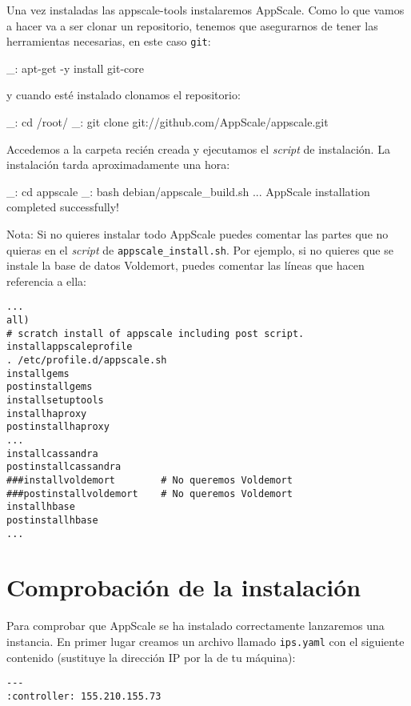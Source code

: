 Una vez instaladas las appscale-tools instalaremos AppScale. Como lo que vamos a hacer va a ser clonar un repositorio, tenemos que asegurarnos de tener las herramientas necesarias, en este caso \texttt{git}:

\begin{bashcode}
_: apt-get -y install git-core
\end{bashcode}

y cuando esté instalado clonamos el repositorio:

\begin{bashcode}
_: cd /root/
_: git clone git://github.com/AppScale/appscale.git
\end{bashcode}

Accedemos a la carpeta recién creada y ejecutamos el \emph{script} de instalación. La instalación tarda aproximadamente una hora:

\begin{bashcode}
_: cd appscale
_: bash debian/appscale_build.sh
...
AppScale installation completed successfully!
\end{bashcode}

Nota: Si no quieres instalar todo AppScale puedes comentar las partes que no quieras en el \emph{script} de \texttt{appscale\_install.sh}. Por ejemplo, si no quieres que se instale la base de datos Voldemort, puedes comentar las líneas que hacen referencia a ella:

\begin{lstlisting}
...
all)
# scratch install of appscale including post script.
installappscaleprofile
. /etc/profile.d/appscale.sh
installgems
postinstallgems
installsetuptools
installhaproxy
postinstallhaproxy
...
installcassandra
postinstallcassandra
###installvoldemort        # No queremos Voldemort
###postinstallvoldemort    # No queremos Voldemort
installhbase
postinstallhbase
...
\end{lstlisting}


\section{Comprobación de la instalación}

Para comprobar que AppScale se ha instalado correctamente lanzaremos una instancia. En primer lugar creamos un archivo llamado \texttt{ips.yaml} con el siguiente contenido (sustituye la dirección IP por la de tu máquina):

\begin{lstlisting}
--- 
:controller: 155.210.155.73
\end{lstlisting}

